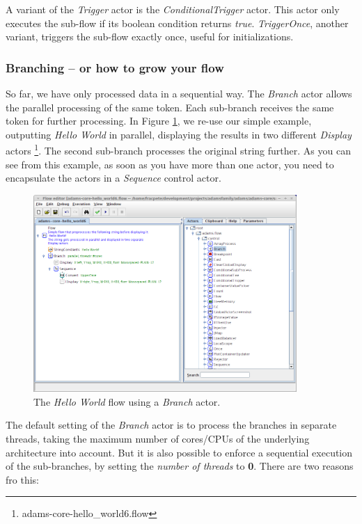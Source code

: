A variant of the \textit{Trigger} actor is the \textit{ConditionalTrigger}
actor. This actor only executes the sub-flow if its boolean condition returns
\textit{true}. \textit{TriggerOnce}, another variant, triggers the sub-flow 
exactly once, useful for initializations.

\subsubsection{Branching -- or how to grow your flow}
So far, we have only processed data in a sequential way. The \textit{Branch}
actor allows the parallel processing of the same token. Each sub-branch receives
the same token for further processing. In Figure
\ref{floweditor-helloworld-branch_flow}, we re-use our simple example,
outputting \textit{Hello World} in parallel, displaying the results in two
different \textit{Display} actors \footnote{adams-core-hello\_world6.flow}. The
second sub-branch processes the original string further. As you can see from this example, as soon as you have more than
one actor, you need to encapsulate the actors in a \textit{Sequence} control
actor.
\begin{figure}[htb]
  \centering
  \includegraphics[width=10.0cm]{images/floweditor-helloworld-branch_flow.png}
  \caption{The \textit{Hello World} flow using a \textit{Branch} actor.}
  \label{floweditor-helloworld-branch_flow}
\end{figure}
The default setting of the \textit{Branch} actor is to process the branches in
separate threads, taking the maximum number of cores/CPUs of the underlying
architecture into account. But it is also possible to enforce a sequential
execution of the sub-branches, by setting the \textit{number of threads} to
\textbf{0}. There are two reasons fro this:
